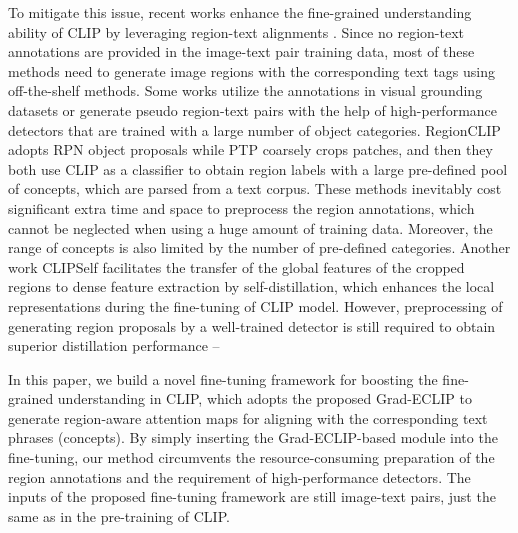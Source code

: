 To mitigate this issue, recent works enhance the fine-grained understanding ability of CLIP by leveraging  region-text alignments  
\cite{chen2020uniter,li2020oscar,zhang2021vinvl,zhong2022regionclip,li2022grounded}.
Since no region-text  annotations are provided in the image-text pair training data, most of these methods need to generate image regions with the corresponding text tags using off-the-shelf methods. Some works utilize the annotations in visual grounding datasets \cite{liu2023grounding,li2022grounded,krishna2017visual} or generate pseudo region-text pairs \cite{chen2020uniter,li2020oscar,zhang2021vinvl} with the help of high-performance detectors that are trained with a large number of object categories. 
RegionCLIP \cite{zhong2022regionclip} adopts RPN \cite{ren2015faster} object proposals while PTP \cite{wang2023position} coarsely crops patches, and then they both use CLIP as a classifier to obtain region labels with a large pre-defined pool of concepts, which are parsed from a text corpus.
These methods inevitably cost significant extra time and space to preprocess the region annotations, which cannot be neglected when using a huge amount of training data. Moreover, the range of concepts is also limited by the number of pre-defined categories. 
Another work CLIPSelf \cite{wu2023clipself} facilitates the transfer of the global features of the cropped regions to dense feature extraction by self-distillation, which enhances the local representations during the fine-tuning of CLIP model. However, preprocessing of generating region proposals by a well-trained detector is still required to obtain superior distillation performance -- 

In this paper, we build a novel fine-tuning framework for boosting the fine-grained understanding in CLIP, which adopts the proposed Grad-ECLIP to generate  region-aware attention maps for aligning with the corresponding text phrases (concepts). By simply inserting the Grad-ECLIP-based module into the fine-tuning, our method circumvents the resource-consuming preparation of the region annotations and the requirement of high-performance detectors.
The inputs of the proposed fine-tuning framework are still image-text pairs, just the same as in the pre-training of CLIP.  




